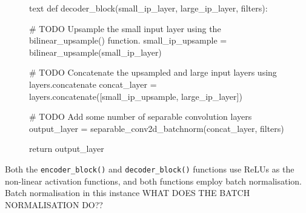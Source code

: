 \documentclass[a4paper]{article}
\begin{document}
\begin{figure}[h]\scriptsize
\begin{sexylisting}{text}
def decoder_block(small_ip_layer, large_ip_layer, filters):
    
    # TODO Upsample the small input layer using the bilinear_upsample() function.
    small_ip_upsample = bilinear_upsample(small_ip_layer)
    
    # TODO Concatenate the upsampled and large input layers using layers.concatenate
    concat_layer = layers.concatenate([small_ip_upsample, large_ip_layer])
    
    # TODO Add some number of separable convolution layers
    output_layer = separable_conv2d_batchnorm(concat_layer, filters)
    
    return output_layer
\end{sexylisting}
\end{figure}

Both the \verb|encoder_block()| and \verb|decoder_block()| functions use ReLUs as the non-linear activation functions, and both functions employ batch normalisation. Batch normalisation in this instance WHAT DOES THE BATCH NORMALISATION DO??

\clearpage
\end{document}
